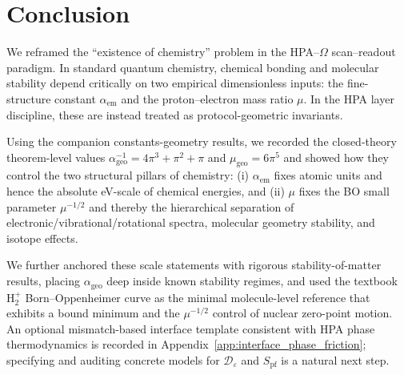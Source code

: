 \section{Conclusion}
\label{sec:conclusion}

We reframed the ``existence of chemistry'' problem in the HPA--$\Omega$ scan--readout paradigm. In standard quantum chemistry, chemical bonding and molecular stability depend critically on two empirical dimensionless inputs: the fine-structure constant $\alpha_{\mathrm{em}}$ and the proton--electron mass ratio $\mu$. In the HPA layer discipline, these are instead treated as protocol-geometric invariants.

Using the companion constants-geometry results, we recorded the closed-theory theorem-level values $\alpha_{\mathrm{geo}}^{-1}=4\pi^3+\pi^2+\pi$ and $\mu_{\mathrm{geo}}=6\pi^5$ and showed how they control the two structural pillars of chemistry:
(i) $\alpha_{\mathrm{em}}$ fixes atomic units and hence the absolute eV-scale of chemical energies, and
(ii) $\mu$ fixes the BO small parameter $\mu^{-1/2}$ and thereby the hierarchical separation of electronic/vibrational/rotational spectra, molecular geometry stability, and isotope effects.

We further anchored these scale statements with rigorous stability-of-matter results, placing $\alpha_{\mathrm{geo}}$ deep inside known stability regimes, and used the textbook $\mathrm{H}_2^+$ Born--Oppenheimer curve as the minimal molecule-level reference that exhibits a bound minimum and the $\mu^{-1/2}$ control of nuclear zero-point motion. An optional mismatch-based interface template consistent with HPA phase thermodynamics is recorded in Appendix~\ref{app:interface_phase_friction}; specifying and auditing concrete models for $\mathcal{D}_\varepsilon$ and $S_{\mathrm{pf}}$ is a natural next step.


